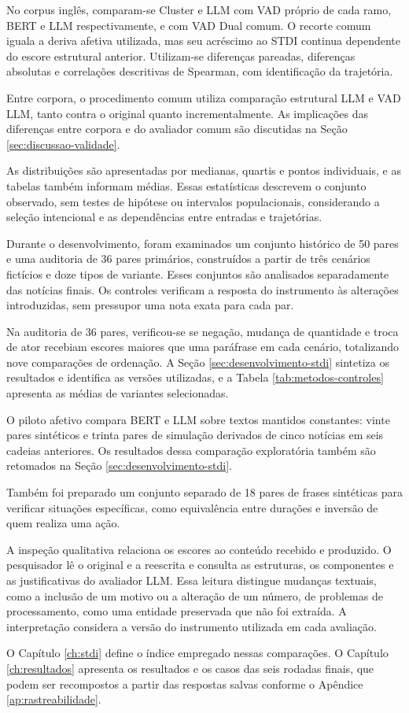 No corpus inglês, comparam-se Cluster e LLM com VAD próprio de cada ramo, BERT e LLM respectivamente, e com VAD Dual comum. O recorte comum iguala a deriva afetiva utilizada, mas seu acréscimo ao STDI continua dependente do escore estrutural anterior. Utilizam-se diferenças pareadas, diferenças absolutas e correlações descritivas de Spearman, com identificação da trajetória.

Entre corpora, o procedimento comum utiliza comparação estrutural LLM e VAD LLM, tanto contra o original quanto incrementalmente. As implicações das diferenças entre corpora e do avaliador comum são discutidas na Seção \ref{sec:discussao-validade}.

As distribuições são apresentadas por medianas, quartis e pontos individuais, e as tabelas também informam médias. Essas estatísticas descrevem o conjunto observado, sem testes de hipótese ou intervalos populacionais, considerando a seleção intencional e as dependências entre entradas e trajetórias.

Durante o desenvolvimento, foram examinados um conjunto histórico de 50 pares e uma auditoria de 36 pares primários, construídos a partir de três cenários fictícios e doze tipos de variante. Esses conjuntos são analisados separadamente das notícias finais. Os controles verificam a resposta do instrumento às alterações introduzidas, sem pressupor uma nota exata para cada par.

Na auditoria de 36 pares, verificou-se se negação, mudança de quantidade e troca de ator recebiam escores maiores que uma paráfrase em cada cenário, totalizando nove comparações de ordenação. A Seção \ref{sec:desenvolvimento-stdi} sintetiza os resultados e identifica as versões utilizadas, e a Tabela \ref{tab:metodos-controles} apresenta as médias de variantes selecionadas.

O piloto afetivo compara BERT e LLM sobre textos mantidos constantes: vinte pares sintéticos e trinta pares de simulação derivados de cinco notícias em seis cadeias anteriores. Os resultados dessa comparação exploratória também são retomados na Seção \ref{sec:desenvolvimento-stdi}.

Também foi preparado um conjunto separado de 18 pares de frases sintéticas para verificar situações específicas, como equivalência entre durações e inversão de quem realiza uma ação.

A inspeção qualitativa relaciona os escores ao conteúdo recebido e produzido. O pesquisador lê o original e a reescrita e consulta as estruturas, os componentes e as justificativas do avaliador LLM. Essa leitura distingue mudanças textuais, como a inclusão de um motivo ou a alteração de um número, de problemas de processamento, como uma entidade preservada que não foi extraída. A interpretação considera a versão do instrumento utilizada em cada avaliação.

O Capítulo \ref{ch:stdi} define o índice empregado nessas comparações. O Capítulo \ref{ch:resultados} apresenta os resultados e os casos das seis rodadas finais, que podem ser recompostos a partir das respostas salvas conforme o Apêndice \ref{ap:rastreabilidade}.
